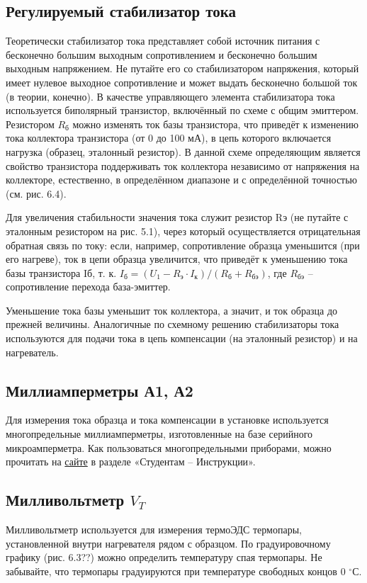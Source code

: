 \subsection{Регулируемый стабилизатор тока}
Теоретически стабилизатор тока представляет собой источник питания с бесконечно большим выходным сопротивлением и
бесконечно большим выходным напряжением. Не путайте его со стабилизатором напряжения, который имеет нулевое выходное
сопротивление и может выдать бесконечно большой ток (в теории, конечно).
В качестве управляющего элемента стабилизатора тока используется биполярный транзистор, включённый по схеме с общим
эмиттером. Резистором $R_\text{б}$ можно изменять ток базы транзистора, что приведёт к изменению тока коллектора
транзистора (от 0 до 100 мА), в цепь которого включается нагрузка (образец, эталонный резистор). В данной схеме
определяющим является свойство транзистора поддерживать ток коллектора независимо от напряжения на коллекторе,
естественно, в определённом диапазоне и с определённой точностью (см. рис. 6.4).


 Для увеличения стабильности значения тока служит резистор Rэ (не путайте с эталонным резистором на рис. 5.1), через
 который осуществляется отрицательная обратная связь по току: если, например, сопротивление образца уменьшится (при его
 нагреве), ток в цепи образца увеличится, что приведёт к уменьшению тока базы транзистора Iб, т. к.
$I_\text{б} = (U_1 - R_\text{э} \cdot I_\text{к}) / (R_\text{б} + R_\text{бэ})$, где $R_\text{бэ}$ – сопротивление перехода база-эмиттер.

Уменьшение тока базы уменьшит ток коллектора, а значит, и ток образца до прежней величины.
Аналогичные по схемному решению стабилизаторы тока используются для подачи тока в цепь компенсации (на эталонный
резистор) и на нагреватель.

\subsection{Миллиамперметры А1, А2}
Для измерения тока образца и тока компенсации в установке используется многопредельные миллиамперметры, изготовленные на
базе серийного микроамперметра. Как пользоваться многопредельными приборами, можно прочитать на
\href{www.rf.unn.ru/eledep/}{сайте} в разделе «Студентам – Инструкции».

\subsection{Милливольтметр $V_T$}
Милливольтметр используется для измерения термоЭДС термопары, установленной внутри нагревателя рядом с образцом. По
градуировочному графику (рис. 6.3??) можно определить температуру спая термопары. Не забывайте, что термопары градуируются
при температуре свободных концов 0 $^{\circ} $С.

